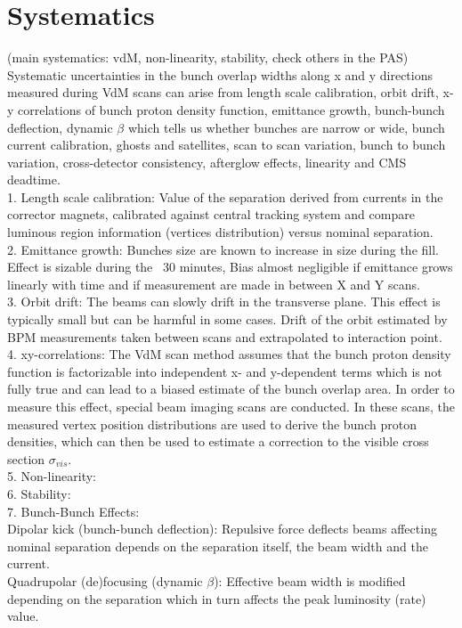 \section{Systematics}
\label{sec:syst}
(main systematics: vdM, non-linearity, stability, check others in the PAS) \\


Systematic uncertainties in the bunch overlap widths along x and y directions measured during VdM scans can arise from length scale calibration, orbit drift, x-y correlations of bunch proton density function, emittance growth, bunch-bunch deflection, dynamic $\beta$ which tells us whether bunches are narrow or wide, bunch current calibration, ghosts and satellites, scan to scan variation, bunch to bunch variation, cross-detector consistency, afterglow effects, linearity and CMS deadtime.  \\

1. Length scale calibration:  Value of the separation derived from currents in the corrector magnets, calibrated against central tracking system and compare luminous region information (vertices distribution) versus nominal separation. \\

2. Emittance growth: Bunches size are known to increase in size during the fill. Effect is sizable during the ~30 minutes, Bias almost negligible if emittance grows linearly with time and if measurement are made in between X and Y scans. \\

3. Orbit drift: The beams can slowly drift in the transverse plane. This effect is typically small but can be harmful in some cases. Drift of the orbit estimated by BPM measurements taken between scans and extrapolated to interaction point. \\

4. xy-correlations: The VdM scan method assumes that the bunch proton density function is factorizable into independent x- and y-dependent terms which is not fully true and can lead to a biased estimate of the bunch overlap area. In order to measure this effect, special beam imaging scans are conducted. In these scans, the measured vertex position distributions are used to derive the bunch proton densities, which can then be used to estimate a correction to the visible cross section $\sigma_{vis}$. \\

5. Non-linearity: \\

6. Stability:  \\

7. Bunch-Bunch Effects: \\

Dipolar kick (bunch-bunch deflection): Repulsive force deflects beams affecting nominal separation depends on the separation itself, the beam width and the current. \\
 
 Quadrupolar (de)focusing (dynamic $\beta$): Effective beam width is modified depending on the separation which in turn affects the peak luminosity (rate) value. \cite{CMS-PAS-LUM-18-002} \\

